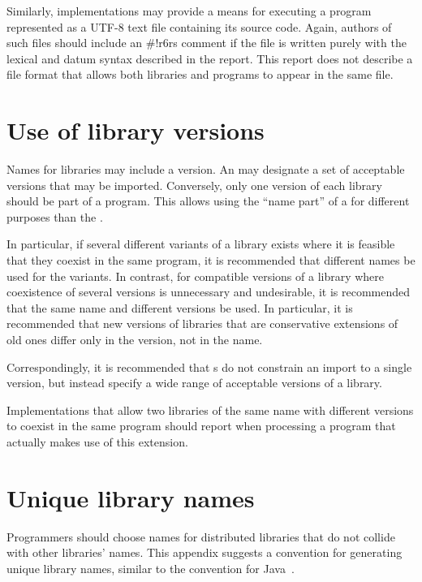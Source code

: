 \documentclass[twoside,twocolumn]{algol60}
\begin{document}
Similarly, implementations may provide a means for executing a program
represented as a UTF-8 text file containing its source code.  Again,
authors of such files should include an {\cf\#!r6rs}
comment if the file is written purely with the lexical and datum syntax
described in the report.  This report does not describe a file format
that allows both libraries and programs to appear in the same file.

\chapter{Use of library versions}

Names for libraries may include a version.  An  may
designate a set of acceptable versions that may be imported.
Conversely, only one version of each library should be part of a
program.  This allows using the ``name part'' of a  for different purposes than the . 

In particular, if several different variants of a library exists where
it is feasible that they coexist in the same program, it is
recommended that different names be used for the variants.  In
contrast, for compatible versions of a library where coexistence of
several versions is unnecessary and undesirable, it is recommended
that the same name and different versions be used.  In particular, it
is recommended that new versions of libraries that are conservative
extensions of old ones differ only in the version, not in the name.

Correspondingly, it is recommended that s do not
constrain an import to a single version, but instead specify a wide
range of acceptable versions of a library.

Implementations that allow two libraries of the same name with
different versions to coexist in the same program should
report when processing a program that actually makes use of this
extension.

\chapter{Unique library names}
\label{librarynamesappendix}

Programmers should choose names for distributed libraries
that do not collide with other libraries' names.
This appendix suggests a convention for generating unique library
names, similar to the convention for Java~\cite{JLS3}.
\end{document}
